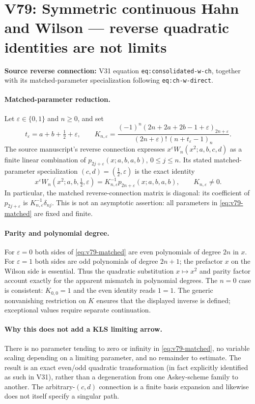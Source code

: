 \documentclass[11pt]{article}
\begin{document}
\section{V79: Symmetric continuous Hahn and Wilson --- reverse quadratic identities are not limits}
\noindent\textbf{Source reverse connection:} V31 equation
\texttt{eq:consolidated-w-ch}, together with its matched-parameter
specialization following \texttt{eq:ch-w-direct}.

\paragraph{Matched-parameter reduction.}
Let $\varepsilon\in\{0,1\}$ and $n\geq0$, and set
\[
 t_\varepsilon=a+b+\tfrac12+\varepsilon,\qquad
 K_{n,\varepsilon}=
 \frac{(-1)^n(2n+2a+2b-1+\varepsilon)_{2n+\varepsilon}}
 {(2n+\varepsilon)!\,(n+t_\varepsilon-1)_n}.
\]
The source manuscript's reverse connection expresses
$x^\varepsilon W_n(x^2;a,b,c,d)$ as a finite linear combination of
$p_{2j+\varepsilon}(x;a,b,a,b)$, $0\leq j\leq n$.
Its stated matched-parameter specialization $(c,d)=(\tfrac12,\varepsilon)$
is the exact identity
\begin{equation}\label{eq:v79-matched}
 x^\varepsilon W_n(x^2;a,b,\tfrac12,\varepsilon)
 =K_{n,\varepsilon}^{-1}p_{2n+\varepsilon}(x;a,b,a,b),
 \qquad K_{n,\varepsilon}\ne0.
\end{equation}
In particular, the matched reverse-connection matrix is diagonal:
its coefficient of $p_{2j+\varepsilon}$ is
$K_{n,\varepsilon}^{-1}\delta_{nj}$.  This is not an
asymptotic assertion: all parameters in \eqref{eq:v79-matched} are
fixed and finite.

\paragraph{Parity and polynomial degree.}
For $\varepsilon=0$ both sides of \eqref{eq:v79-matched} are even
polynomials of degree $2n$ in $x$. For $\varepsilon=1$ both sides are
odd polynomials of degree $2n+1$; the prefactor $x$ on the Wilson side
is essential.  Thus the quadratic substitution $x\mapsto x^2$ and
parity factor account exactly for the apparent mismatch in polynomial
degrees. The $n=0$ case is consistent: $K_{0,0}=1$ and the even
identity reads $1=1$.  The generic nonvanishing restriction on $K$
ensures that the displayed inverse is defined; exceptional values
require separate continuation.

\paragraph{Why this does not add a KLS limiting arrow.}
There is no parameter tending to zero or infinity in
\eqref{eq:v79-matched}, no variable scaling depending on a limiting
parameter, and no remainder to estimate.  The result is an exact
even/odd quadratic transformation (in fact explicitly identified as
such in V31), rather than a degeneration from one Askey-scheme family
to another. The arbitrary-$(c,d)$ connection is a finite basis
expansion and likewise does not itself specify a singular path.
\end{document}
